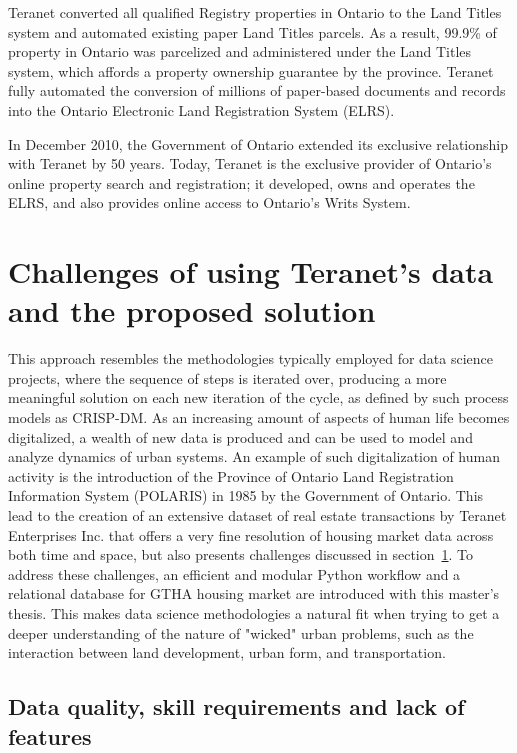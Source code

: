 Teranet converted all qualified Registry properties in Ontario to the Land Titles system and automated existing paper Land Titles parcels.
As a result, 99.9\% of property in Ontario was parcelized and administered under the Land Titles system, which affords a property ownership guarantee by the province.
Teranet fully automated the conversion of millions of paper-based documents and records into the Ontario Electronic Land Registration System (ELRS).

In December 2010, the Government of Ontario extended its exclusive relationship with Teranet by 50 years.
Today, Teranet is the exclusive provider of Ontario's online property search and registration;
it developed, owns and operates the ELRS, and also provides online access to Ontario's Writs System.

\section{Challenges of using Teranet's data and the proposed solution} \label{sec:challenges}

This approach resembles the methodologies typically employed for data science projects, where the sequence of steps is iterated over, producing a more meaningful solution on each new iteration of the cycle, as defined by such process models as CRISP-DM\cite{Shearer2000}.
As an increasing amount of aspects of human life becomes digitalized, a wealth of new data is produced and can be used to model and analyze dynamics of urban systems\cite{Arribas-Bel2014, Chen2016}.
An example of such digitalization of human activity is the introduction of the Province of Ontario Land Registration Information System (POLARIS) in 1985 by the Government of Ontario\cite{TeranetEnterprisesInc.}.
This lead to the creation of an extensive dataset of real estate transactions by Teranet Enterprises Inc.
that offers a very fine resolution of housing market data across both time and space, but also presents challenges discussed in section~\ref{sec:challenges}.
To address these challenges, an efficient and modular Python workflow and a relational database for GTHA housing market are introduced with this master's thesis.
This makes data science methodologies a natural fit when trying to get a deeper understanding of the nature of "wicked" urban problems, such as the interaction between land development, urban form, and transportation.

\subsection{Data quality, skill requirements and lack of features} \label{subsec:challenges_quality_skills_features}

